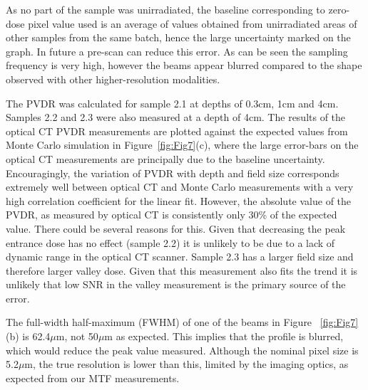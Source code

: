 \documentclass[12pt]{article}
\begin{document}
As no part of the sample was unirradiated, the baseline corresponding to zero-dose pixel value used is an average of values obtained from unirradiated areas of other samples from the same batch, hence the large uncertainty marked on the graph. In future a pre-scan can reduce this error. As can be seen the sampling frequency is very high, however the beams appear blurred compared to the shape observed with other higher-resolution modalities. 

The PVDR was calculated for sample 2.1 at depths of 0.3cm, 1cm and 4cm. Samples 2.2 and 2.3 were also measured at a depth of 4cm. The results of the optical CT PVDR measurements are plotted against the expected values from Monte Carlo simulation \cite{martinez-roviradevelopment2012} in Figure~\ref{fig:Fig7}(c), where the large error-bars on the optical CT measurements are principally due to the baseline uncertainty. Encouragingly, the variation of PVDR with depth and field size corresponds extremely well between optical CT and Monte Carlo measurements with a very high correlation coefficient for the linear fit. However, the absolute value of the PVDR, as measured by optical CT is consistently only 30\% of the expected value. There could be several reasons for this. Given that decreasing the peak entrance dose has no effect (sample 2.2) it is unlikely to be due to a lack of dynamic range in the optical CT scanner. Sample 2.3 has a larger field size and therefore larger valley dose. Given that this measurement also fits the trend it is unlikely that low SNR in the valley measurement is the primary source of the error. 

The full-width half-maximum (FWHM) of one of the beams in Figure ~\ref{fig:Fig7}(b) is 62.4$\mu$m, not 50$\mu$m as expected. This implies that the profile is blurred, which would reduce the peak value measured. Although the nominal pixel size is 5.2$\mu$m, the true resolution is lower than this, limited by the imaging optics, as expected from our MTF measurements. 
\end{document}
